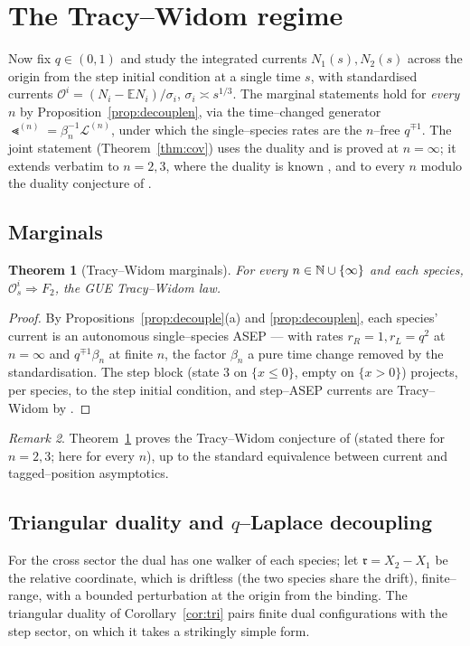 \documentclass[11pt]{article}
\theoremstyle{plain}
\newtheorem{theorem}{Theorem}[section]
\theoremstyle{definition}
\theoremstyle{remark}
\newtheorem{remark}[theorem]{Remark}
\newcommand{\E}{\mathbb{E}}\newcommand{\PP}{\mathbb{P}}\newcommand{\dd}{\,\mathrm{d}}
\newcommand{\To}{\Rightarrow}\newcommand{\so}{\mathfrak{so}}
\newcommand{\cL}{\mathcal L}\newcommand{\cO}{\mathcal O}\newcommand{\cE}{\mathcal E}
\begin{document}
\section{The Tracy--Widom regime}\label{sec:tw}

Now fix $q\in(0,1)$ and study the integrated currents $N_1(s),N_2(s)$ across the origin
from the step initial condition at a single time $s$, with standardised currents
$\cO^i=(N_i-\E N_i)/\sigma_i$, $\sigma_i\asymp s^{1/3}$. The marginal statements hold
for \emph{every} $n$ by Proposition~\ref{prop:decouplen}, via the time--changed
generator $\Lt^{(n)}=\beta_n^{-1}\cL^{(n)}$, under which the single--species rates
are the $n$--free $q^{\mp1}$. The joint statement (Theorem~\ref{thm:cov}) uses the
duality and is proved at $n=\infty$; it extends verbatim to $n=2,3$, where the
duality is known \cite{REU}, and to every $n$ modulo the duality conjecture of
\cite[Rmk.~4]{REU}.

\subsection{Marginals}
\begin{theorem}[Tracy--Widom marginals]\label{thm:marg}
For every $n\in\mathbb{N}\cup\{\infty\}$ and each species, $\cO^i_s\To F_2$, the GUE
Tracy--Widom law.
\end{theorem}
\begin{proof}
By Propositions~\ref{prop:decouple}(a) and \ref{prop:decouplen}, each species' current
is an autonomous single--species ASEP --- with rates $r_R=1,r_L=q^2$ at $n=\infty$ and
$q^{\mp1}\beta_n$ at finite $n$, the factor $\beta_n$ a pure time change removed by
the standardisation. The step block (state $3$ on $\{x\le0\}$, empty on $\{x>0\}$)
projects, per species, to the step initial condition, and step--ASEP currents are
Tracy--Widom by \cite[Thm.~1.4]{BCS}.
\end{proof}

\begin{remark}
Theorem~\ref{thm:marg} proves the Tracy--Widom conjecture of \cite[\S3.1.1]{REU}
(stated there for $n=2,3$; here for every $n$), up to the standard equivalence
between current and tagged--position asymptotics.
\end{remark}

\subsection{Triangular duality and $q$--Laplace decoupling}
For the cross sector the dual has one walker of each species; let
$\mathfrak r=X_2-X_1$ be the relative coordinate, which is driftless (the two species
share the drift), finite--range, with a bounded perturbation at the origin from the
binding. The triangular duality of Corollary~\ref{cor:tri} pairs finite dual
configurations with the step sector, on which it takes a strikingly simple form.
\end{document}
